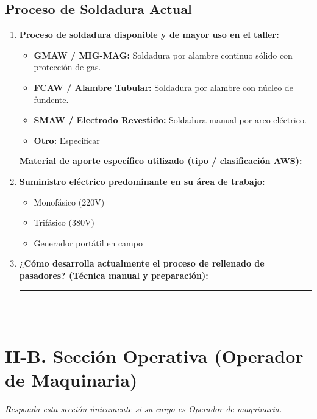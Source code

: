 \documentclass[11pt,a4paper]{article}
\begin{document}
\subsection*{Proceso de Soldadura Actual}
\begin{enumerate}[resume=encuesta, leftmargin=*]
    \item \textbf{Proceso de soldadura disponible y de mayor uso en el taller:}
    \begin{itemize}[label=$\square$, leftmargin=*]
        \item \textbf{GMAW / MIG-MAG:} Soldadura por alambre continuo sólido con protección de gas.
        \item \textbf{FCAW / Alambre Tubular:} Soldadura por alambre con núcleo de fundente.
        \item \textbf{SMAW / Electrodo Revestido:} Soldadura manual por arco eléctrico.
        \item \textbf{Otro:} Especificar \hrulefill
    \end{itemize}
    \textbf{Material de aporte específico utilizado (tipo / clasificación AWS):} \hrulefill

    \item \textbf{Suministro eléctrico predominante en su área de trabajo:}
    \begin{itemize}[label=$\square$, leftmargin=*]
        \item Monofásico (220V)
        \item Trifásico (380V)
        \item Generador portátil en campo
    \end{itemize}

    \item \textbf{¿Cómo desarrolla actualmente el proceso de rellenado de pasadores? (Técnica manual y preparación):}\\
    \rule{\linewidth}{0.4pt}\\[0.2cm]
    \rule{\linewidth}{0.4pt}
\end{enumerate}

\newpage
\section*{II-B. Sección Operativa (Operador de Maquinaria)}
\label{sec:operador}
\noindent\textit{Responda esta sección únicamente si su cargo es Operador de maquinaria.}
\vspace{0.2cm}
\end{document}
